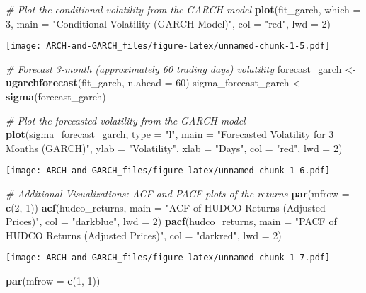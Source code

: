 \documentclass[
]{article}
\newenvironment{Shaded}{\begin{snugshade}}{\end{snugshade}}
\newcommand{\AttributeTok}[1]{\textcolor[rgb]{0.13,0.29,0.53}{#1}}
\newcommand{\CommentTok}[1]{\textcolor[rgb]{0.56,0.35,0.01}{\textit{#1}}}
\newcommand{\DecValTok}[1]{\textcolor[rgb]{0.00,0.00,0.81}{#1}}
\newcommand{\FunctionTok}[1]{\textcolor[rgb]{0.13,0.29,0.53}{\textbf{#1}}}
\newcommand{\NormalTok}[1]{#1}
\newcommand{\OtherTok}[1]{\textcolor[rgb]{0.56,0.35,0.01}{#1}}
\newcommand{\StringTok}[1]{\textcolor[rgb]{0.31,0.60,0.02}{#1}}
\begin{document}
\begin{Shaded}
\begin{Highlighting}[]
\CommentTok{\# Plot the conditional volatility from the GARCH model}
\FunctionTok{plot}\NormalTok{(fit\_garch, }\AttributeTok{which =} \DecValTok{3}\NormalTok{, }\AttributeTok{main =} \StringTok{"Conditional Volatility (GARCH Model)"}\NormalTok{, }
     \AttributeTok{col =} \StringTok{"red"}\NormalTok{, }\AttributeTok{lwd =} \DecValTok{2}\NormalTok{)}
\end{Highlighting}
\end{Shaded}

\texttt{[image: ARCH-and-GARCH\_files/figure-latex/unnamed-chunk-1-5.pdf]}

\begin{Shaded}
\begin{Highlighting}[]
\CommentTok{\# Forecast 3{-}month (approximately 60 trading days) volatility}
\NormalTok{forecast\_garch }\OtherTok{\textless{}{-}} \FunctionTok{ugarchforecast}\NormalTok{(fit\_garch, }\AttributeTok{n.ahead =} \DecValTok{60}\NormalTok{)}
\NormalTok{sigma\_forecast\_garch }\OtherTok{\textless{}{-}} \FunctionTok{sigma}\NormalTok{(forecast\_garch)}

\CommentTok{\# Plot the forecasted volatility from the GARCH model}
\FunctionTok{plot}\NormalTok{(sigma\_forecast\_garch, }\AttributeTok{type =} \StringTok{"l"}\NormalTok{, }\AttributeTok{main =} \StringTok{"Forecasted Volatility for 3 Months (GARCH)"}\NormalTok{, }
     \AttributeTok{ylab =} \StringTok{"Volatility"}\NormalTok{, }\AttributeTok{xlab =} \StringTok{"Days"}\NormalTok{, }\AttributeTok{col =} \StringTok{"red"}\NormalTok{, }\AttributeTok{lwd =} \DecValTok{2}\NormalTok{)}
\end{Highlighting}
\end{Shaded}

\texttt{[image: ARCH-and-GARCH\_files/figure-latex/unnamed-chunk-1-6.pdf]}

\begin{Shaded}
\begin{Highlighting}[]
\CommentTok{\# Additional Visualizations: ACF and PACF plots of the returns}
\FunctionTok{par}\NormalTok{(}\AttributeTok{mfrow =} \FunctionTok{c}\NormalTok{(}\DecValTok{2}\NormalTok{, }\DecValTok{1}\NormalTok{))}
\FunctionTok{acf}\NormalTok{(hudco\_returns, }\AttributeTok{main =} \StringTok{"ACF of HUDCO Returns (Adjusted Prices)"}\NormalTok{, }\AttributeTok{col =} \StringTok{"darkblue"}\NormalTok{, }\AttributeTok{lwd =} \DecValTok{2}\NormalTok{)}
\FunctionTok{pacf}\NormalTok{(hudco\_returns, }\AttributeTok{main =} \StringTok{"PACF of HUDCO Returns (Adjusted Prices)"}\NormalTok{, }\AttributeTok{col =} \StringTok{"darkred"}\NormalTok{, }\AttributeTok{lwd =} \DecValTok{2}\NormalTok{)}
\end{Highlighting}
\end{Shaded}

\texttt{[image: ARCH-and-GARCH\_files/figure-latex/unnamed-chunk-1-7.pdf]}

\begin{Shaded}
\begin{Highlighting}[]
\FunctionTok{par}\NormalTok{(}\AttributeTok{mfrow =} \FunctionTok{c}\NormalTok{(}\DecValTok{1}\NormalTok{, }\DecValTok{1}\NormalTok{))}
\end{Highlighting}
\end{Shaded}
\end{document}
